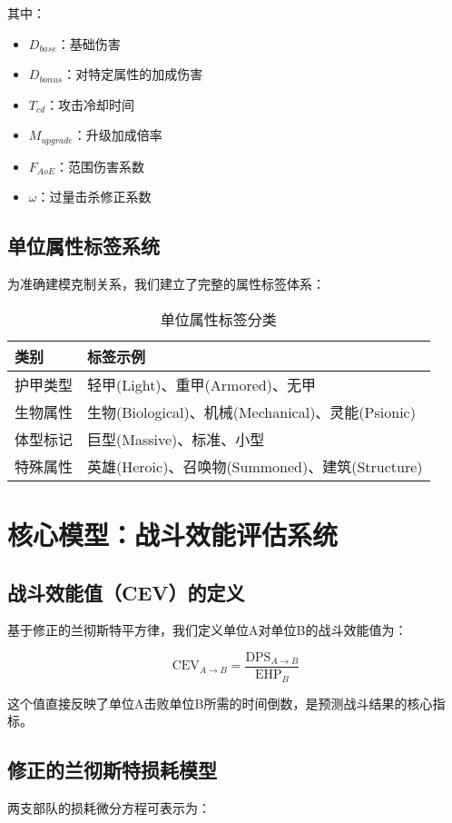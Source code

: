 \documentclass[a4paper,12pt]{article}
\begin{document}
\begin{CJK}{UTF8}{gbsn}
其中：
\begin{itemize}
\item $D_{base}$：基础伤害
\item $D_{bonus}$：对特定属性的加成伤害
\item $T_{cd}$：攻击冷却时间
\item $M_{upgrade}$：升级加成倍率
\item $F_{AoE}$：范围伤害系数
\item $\omega$：过量击杀修正系数
\end{itemize}

\subsection{单位属性标签系统}
为准确建模克制关系，我们建立了完整的属性标签体系：

\begin{table}[h]
\centering
\caption{单位属性标签分类}
\begin{tabular}{ll}
\toprule
\textbf{类别} & \textbf{标签示例} \\
\midrule
护甲类型 & 轻甲(Light)、重甲(Armored)、无甲 \\
生物属性 & 生物(Biological)、机械(Mechanical)、灵能(Psionic) \\
体型标记 & 巨型(Massive)、标准、小型 \\
特殊属性 & 英雄(Heroic)、召唤物(Summoned)、建筑(Structure) \\
\bottomrule
\end{tabular}
\end{table}

\section{核心模型：战斗效能评估系统}

\subsection{战斗效能值（CEV）的定义}
基于修正的兰彻斯特平方律，我们定义单位A对单位B的战斗效能值为：

\begin{equation}
\text{CEV}_{A \rightarrow B} = \frac{\text{DPS}_{A \rightarrow B}}{\text{EHP}_B}
\end{equation}

这个值直接反映了单位A击败单位B所需的时间倒数，是预测战斗结果的核心指标。

\subsection{修正的兰彻斯特损耗模型}
两支部队的损耗微分方程可表示为：


\end{CJK}
\end{document}
